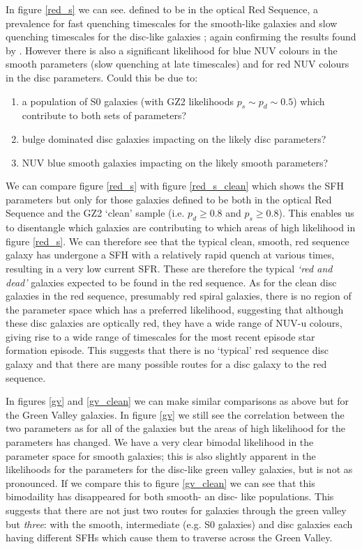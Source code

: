 \documentclass{mn2e}
\begin{document}
In figure \ref{red_s} we can see. defined to be in the optical Red Sequence, a prevalence for fast quenching timescales for the smooth-like galaxies and slow quenching timescales for the disc-like galaxies ; again confirming the results found by \citet{Sch2014}. However there is also a significant likelihood for blue NUV colours in the smooth parameters (slow quenching at late timescales) and for red NUV colours in the disc parameters. Could this be due to:
\begin{enumerate}[i] 
\item a population of S0 galaxies (with GZ2 likelihoods $p_s \sim p_d \sim 0.5$) which contribute to both sets of parameters? 
\item bulge dominated disc galaxies impacting on the likely disc parameters?
\item NUV blue smooth galaxies impacting on the likely smooth parameters? 
\end{enumerate}
We can compare figure \ref{red_s} with figure \ref{red_s_clean} which shows the SFH parameters but only for those galaxies defined to be both in the optical Red Sequence and the GZ2 `clean' sample (i.e. $p_d \geq 0.8$ and $p_s \geq 0.8$). This enables us to disentangle which galaxies are contributing to which areas of high likelihood in figure \ref{red_s}. We can therefore see that the typical clean, smooth, red sequence galaxy has undergone a SFH with a relatively rapid quench at various times, resulting in a very low current SFR. These are therefore the typical \emph{`red and dead'} galaxies expected to be found in the red sequence. As for the clean disc  galaxies in the red sequence, presumably red spiral galaxies, there is no region of the parameter space which has a preferred likelihood, suggesting that although these disc galaxies are optically red, they have a wide range of NUV-u colours, giving rise to a wide range of timescales for the most recent episode star formation episode. This suggests that there is no `typical' red sequence disc galaxy and that there are many possible routes for a disc galaxy to the red sequence. 

In figures \ref{gv} and \ref{gv_clean} we can make similar comparisons as above but for the Green Valley galaxies. In figure \ref{gv} we still see the correlation between the two parameters as for all of the galaxies but the areas of high likelihood for the parameters has changed. We have a very clear bimodal likelihood in the parameter space for smooth galaxies; this is also slightly apparent in the likelihoods for the parameters for the disc-like green valley galaxies, but is not as pronounced. If we compare this to figure \ref{gv_clean} we can see that this bimodaility has disappeared for both smooth- an disc- like populations. This suggests that there are not just two routes for galaxies through the green valley but \emph{three}: with the smooth, intermediate (e.g. S0 galaxies) and disc galaxies each having different SFHs which cause them to traverse across the Green Valley.
\end{document}
